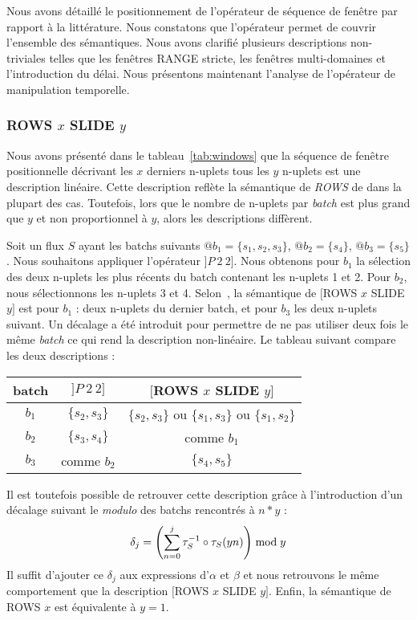 Nous avons détaillé le positionnement de l'opérateur de séquence de fenêtre par rapport à la littérature. Nous constatons que l'opérateur permet de couvrir l'ensemble des sémantiques. Nous avons clarifié plusieurs descriptions non-triviales telles que les fenêtres RANGE stricte, les fenêtres multi-domaines et l'introduction du délai. Nous présentons maintenant l'analyse de l'opérateur de manipulation temporelle.

\subsubsection{ROWS $x$ SLIDE $y$}
Nous avons présenté dans le tableau~\ref{tab:windows} que la séquence de fenêtre positionnelle décrivant les $x$ derniers n-uplets tous les $y$ n-uplets est une description linéaire. Cette description reflète la sémantique de \textit{ROWS} de dans la plupart des cas. Toutefois, lors que le nombre de n-uplets par \textit{batch} est plus grand que $y$ et non proportionnel à $y$, alors les descriptions diffèrent.

Soit un flux $S$ ayant les batchs suivants $@b_1=\{s_1, s_2, s_3\}$, $@b_2=\{s_4\}$, $@b_3=\{s_5\}$. Nous souhaitons appliquer l'opérateur $]P\ 2\ 2]$. Nous obtenons pour $b_1$ la sélection des deux n-uplets les plus récents du batch contenant les n-uplets 1 et 2. Pour $b_2$, nous sélectionnons les n-uplets 3 et 4. Selon~\cite{Jain:spread}, la sémantique de $[$ROWS $x$ SLIDE $y]$ est pour $b_1$ : deux n-uplets du dernier batch, et pour $b_3$ les deux n-uplets suivant. Un décalage a été introduit pour permettre de ne pas utiliser deux fois le même \textit{batch} ce qui rend la description non-linéaire. Le tableau suivant compare les deux descriptions :

\begin{center}
\begin{tabular}{|c|c|c|} \bottomrule
batch & $]P\ 2\ 2]$ & $[$ROWS $x$ SLIDE $y]$\\ \hline
$b_1$ & $\{s_2,s_3\}$ & $\{s_2,s_3\}$ ou $\{s_1,s_3\}$ ou $\{s_1,s_2\}$ \\\hline
$b_2$ & $\{s_3,s_4\}$ & comme $b_1$ \\\hline
$b_3$ & comme $b_2$ & $\{s_4,s_5\}$ \\ \toprule
\end{tabular}
\end{center}

Il est toutefois possible de retrouver cette description grâce à l'introduction d'un décalage suivant le \textit{modulo} des batchs rencontrés à $n*y$ : $$\delta_j = \left(\sum_{n=0}^j \tau^{-1}_S\circ \tau_S(yn)\right) \bmod y$$
Il suffit d'ajouter ce $\delta_j$ aux expressions d'$\alpha$ et $\beta$ et nous retrouvons le même comportement que la description $[$ROWS $x$ SLIDE $y]$. Enfin, la sémantique de ROWS $x$ est équivalente à $y=1$.
 
